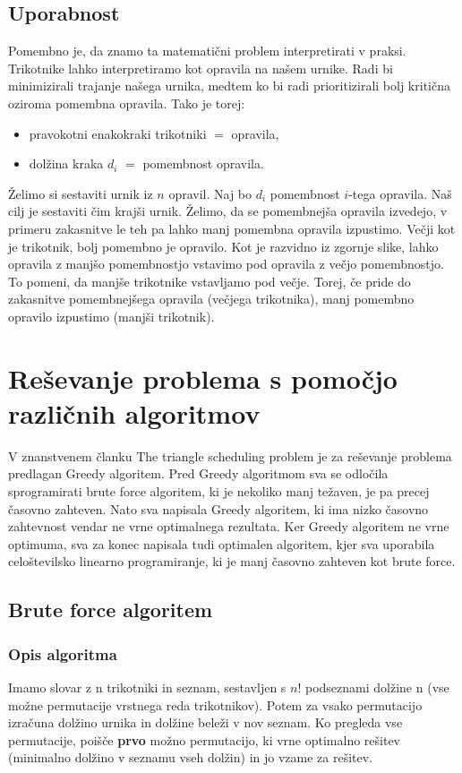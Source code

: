 \documentclass[a4paper,12pt]{article}
\theoremstyle{definition}
\theoremstyle{plain}
\begin{document}
\subsection{Uporabnost}
Pomembno je, da znamo ta matematični problem interpretirati v praksi. Trikotnike lahko interpretiramo kot opravila na našem urnike. Radi bi minimizirali trajanje našega urnika, medtem ko bi radi prioritizirali bolj kritična oziroma pomembna opravila.
Tako je torej:
\begin{itemize}
    \item pravokotni enakokraki trikotniki $=$ opravila,
    \item dolžina kraka $d_i$ $=$ pomembnost opravila.
\end{itemize}

Želimo si sestaviti urnik iz $n$ opravil. Naj bo $d_i$ pomembnost $i$-tega opravila. Naš cilj je sestaviti čim krajši urnik. Želimo, da se pomembnejša opravila izvedejo, v primeru zakasnitve le teh pa lahko manj pomembna opravila izpustimo.
Večji kot je trikotnik, bolj pomembno je opravilo. Kot je razvidno iz zgornje slike, lahko opravila z manjšo pomembnostjo vstavimo pod opravila z večjo pomembnostjo. To pomeni, da manjše trikotnike vstavljamo pod večje. Torej, če pride do zakasnitve
pomembnejšega opravila (večjega trikotnika), manj pomembno opravilo  izpustimo (manjši trikotnik).


\section{Reševanje problema s pomočjo različnih algoritmov}
V znanstvenem članku The triangle scheduling problem \cite{triangle} je za reševanje problema predlagan Greedy algoritem. Pred Greedy algoritmom sva se odločila sprogramirati brute force algoritem, ki je nekoliko manj težaven, je pa precej časovno zahteven. 
Nato sva napisala Greedy algoritem, ki ima nizko časovno zahtevnost vendar ne vrne optimalnega rezultata. Ker Greedy algoritem ne vrne optimuma, sva za konec napisala tudi optimalen algoritem, kjer sva uporabila celoštevilsko linearno programiranje, ki je manj časovno zahteven kot brute force.


\subsection{Brute force algoritem}
\subsubsection{Opis algoritma}
Imamo slovar z n trikotniki in seznam, sestavljen s $n!$ podseznami dolžine n
(vse možne permutacije vrstnega reda trikotnikov). Potem za vsako permutacijo izračuna dolžino urnika in 
dolžine beleži v nov seznam. Ko pregleda vse permutacije, poišče \textbf{prvo} možno permutacijo, ki vrne optimalno rešitev
(minimalno dolžino v seznamu vseh dolžin) in jo vzame za rešitev.
\end{document}
